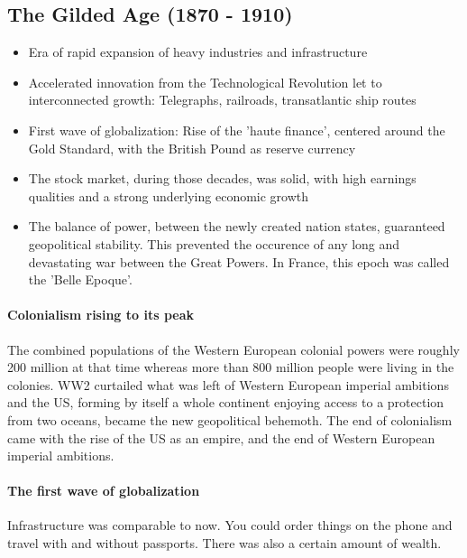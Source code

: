 \subsection{The Gilded Age (1870 - 1910)}

\begin{itemize}
    \item Era of rapid expansion of heavy industries and infrastructure
    \item Accelerated innovation from the Technological Revolution let to
        interconnected growth: Telegraphs, railroads, transatlantic ship
        routes
    \item First wave of globalization: Rise of the 'haute finance',
        centered around the Gold Standard, with the British Pound as
        reserve currency
    \item The stock market, during those decades, was solid, with high
        earnings qualities and a strong underlying economic growth
    \item The balance of power, between the newly created nation states,
        guaranteed geopolitical stability. This prevented the occurence
        of any long and devastating war between the Great Powers. In France,
        this epoch was called the 'Belle Epoque'.
\end{itemize}

\paragraph{Colonialism rising to its peak}
The combined populations of the Western European colonial powers were
roughly 200 million at that time whereas more than 800 million people
were living in the colonies. WW2 curtailed what was left of Western
European imperial ambitions and the US, forming by itself a whole
continent enjoying access to a protection from two oceans, became the new
geopolitical behemoth. The end of colonialism came with the rise of the US
as an empire, and the end of Western European imperial ambitions.

\paragraph{The first wave of globalization}
Infrastructure was comparable to now. You could order things on the phone
and travel with and without passports. There was also a certain amount
of wealth.

\vspace{1\baselineskip}


